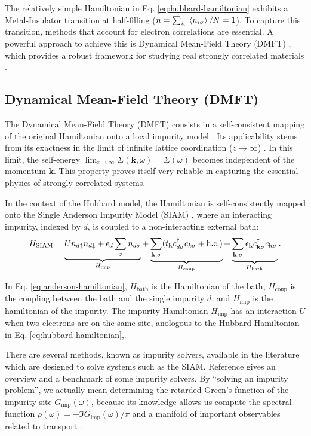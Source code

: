 \documentclass[12pt]{report}
\begin{document}
The relatively simple Hamiltonian in Eq. \eqref{eq:hubbard-hamiltonian} exhibits a Metal-Insulator transition at half-filling ($n = \sum_{i\sigma} \ev{n_{i\sigma}} / N = 1$). To capture this transition, methods that account for electron correlations are essential. A powerful approach to achieve this is Dynamical Mean-Field Theory (DMFT) \cite{georges1996}, which provides a robust framework for studying real strongly correlated materials \cite{haule_real_materials}.

\subsection{Dynamical Mean-Field Theory (DMFT)} \label{sec:dmft}

The Dynamical Mean-Field Theory (DMFT) consists in a self-consistent mapping of the original Hamiltonian onto a local impurity model \cite{thesis_dmft_graz}. Its applicability stems from its exactness in the limit of infinite lattice coordination ($z \to \infty$) \cite{georges1996}. In this limit, the self-energy $\displaystyle{\lim_{z \to \infty}\Sigma(\mathbf{k},\omega) = \Sigma(\omega)}$ becomes independent of the momentum $\mathbf{k}$. This property proves itself very reliable in capturing the essential physics of strongly correlated systems.

In the context of the Hubbard model, the Hamiltonian is self-consistently mapped onto the Single Anderson Impurity Model (SIAM) \cite{impurity-solvers, georges1996}, where an interacting impurity, indexed by $d$, is coupled to a non-interacting external bath:
\begin{equation} \label{eq:anderson-hamiltonian}
H_{\text{SIAM}} = \underbrace{U n_{d{\uparrow}} n_{d{\downarrow}} + \epsilon_d \sum_{{\sigma}} n_{d{\sigma}}}_{H_{\text{imp}}}
+ \underbrace{\sum_{{\vb{k}},{\sigma}} (t_{\vb{k}} c_{d{\sigma}}^\dagger c_{k{\sigma}} + {\text{h.c.}})}_{H_{\text{coup}}}
+ \underbrace{\sum_{{\vb{k}},{\sigma}} \epsilon_{\vb{k}} c_{{\vb{k}}{\sigma}}^\dagger c_{{\vb{k}}{\sigma}}}_{H_{\text{bath}}}.
\end{equation}

In Eq. \eqref{eq:anderson-hamiltonian}, $H_{\text{bath}}$ is the Hamiltonian of the bath, $H_{\text{coup}}$ is the coupling between the bath and the single impurity $d$, and $H_{\text{imp}}$ is the hamiltonian of the impurity. The impurity Hamiltonian $H_{\text{imp}}$  has an interaction $U$ when two electrons are on the same site, anologous to the Hubbard Hamiltonian in Eq. \eqref{eq:hubbard-hamiltonian},.

There are several methods, known as impurity solvers, available in the literature which are designed to solve systems such as the SIAM. Reference \cite{impurity-solvers} gives an overview and a benchmark of some impurity solvers. By ``solving an impurity problem'', we actually mean determining the retarded Green's function of the impurity site $G_{\text{imp}}(\omega)$, because its knowledge allows us compute the spectral function $\displaystyle{\rho(\omega) = - \Im{G_{\text{imp}}(\omega)}} / \pi$ and a manifold of important observables related to transport \cite{pedagogical-gfs}.
\end{document}
